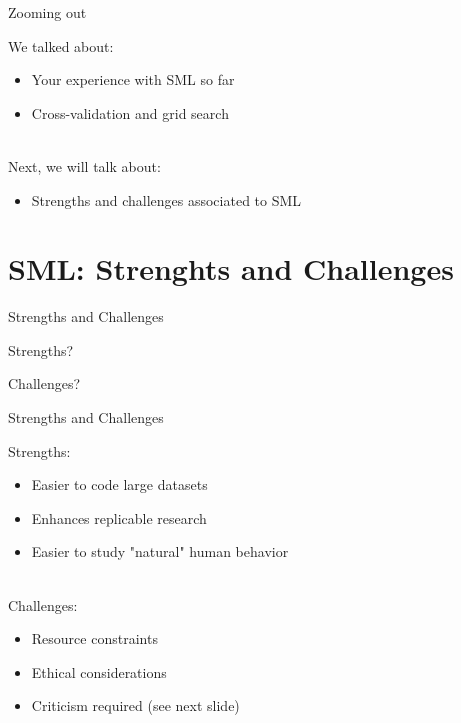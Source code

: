 \documentclass[handout]{beamer}
\begin{document}
\begin{frame}{Zooming out} 
	
	We talked about:
	\begin{itemize}
		\item Your experience with SML so far
		\item Cross-validation and grid search \\\
	\end{itemize}
	
	Next, we will talk about:
	\begin{itemize}
		\item Strengths and challenges associated to SML
	\end{itemize}
	
\end{frame}


\section{SML: Strenghts and Challenges}


\begin{frame}{Strengths and Challenges} 
	
Strengths?

	
Challenges?

\end{frame}



\begin{frame}{Strengths and Challenges} 
	
Strengths:
\begin{itemize}
	\item Easier to code large datasets
	\item Enhances replicable research
	\item Easier to study "natural" human behavior \\\
\end{itemize}
	
Challenges:
\begin{itemize}
	\item Resource constraints
	\item Ethical considerations
	\item Criticism required (see next slide)
\end{itemize}



\end{frame}
\end{document}

